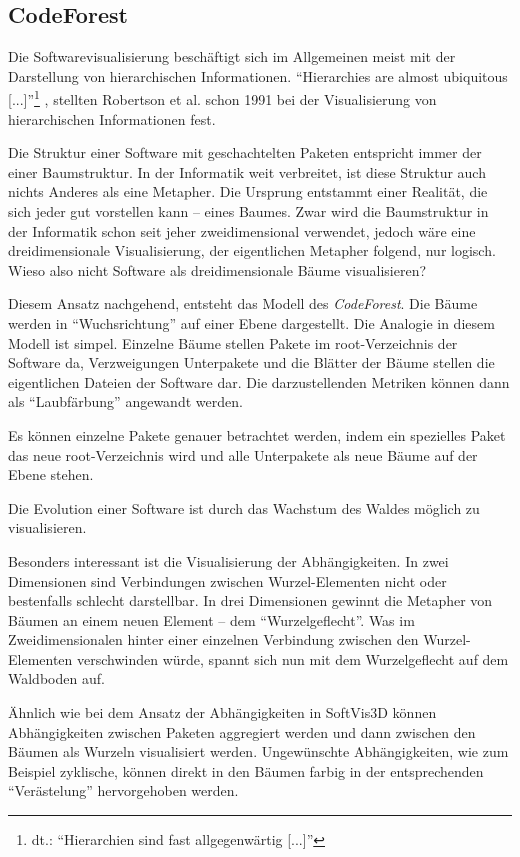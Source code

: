\subsection{CodeForest}

Die Softwarevisualisierung beschäftigt sich im Allgemeinen meist mit der Darstellung von hierarchischen Informationen. ``Hierarchies are almost ubiquitous [...]''\footnote{dt.: "`Hierarchien sind fast allgegenwärtig [...]"'} \cite{robertson1991cone}, stellten Robertson et al. schon 1991 bei der Visualisierung von hierarchischen Informationen fest.

Die Struktur einer Software mit geschachtelten Paketen entspricht immer der einer Baumstruktur. In der Informatik weit verbreitet, ist diese Struktur auch nichts Anderes als eine Metapher. Die Ursprung entstammt einer Realität, die sich jeder gut vorstellen kann -- eines Baumes. Zwar wird die Baumstruktur in der Informatik schon seit jeher zweidimensional verwendet, jedoch wäre eine dreidimensionale Visualisierung, der eigentlichen Metapher folgend, nur logisch. Wieso also nicht Software als dreidimensionale Bäume visualisieren?

Diesem Ansatz nachgehend, entsteht das Modell des \textit{CodeForest}. Die Bäume werden in "`Wuchsrichtung"' auf einer Ebene dargestellt. Die Analogie in diesem Modell ist simpel. Einzelne Bäume stellen Pakete im root-Verzeichnis der Software da, Verzweigungen Unterpakete und die Blätter der Bäume stellen die eigentlichen Dateien der Software dar. Die darzustellenden Metriken können dann als "`Laubfärbung"' angewandt werden. 

Es können einzelne Pakete genauer betrachtet werden, indem ein spezielles Paket das neue root-Verzeichnis wird und alle Unterpakete als neue Bäume auf der Ebene stehen.

Die Evolution einer Software ist durch das Wachstum des Waldes möglich zu visualisieren.

Besonders interessant ist die Visualisierung der Abhängigkeiten. In zwei Dimensionen sind Verbindungen zwischen Wurzel-Elementen nicht oder bestenfalls schlecht darstellbar. In drei Dimensionen gewinnt die Metapher von Bäumen an einem neuen Element -- dem "`Wurzelgeflecht"'. Was im Zweidimensionalen hinter einer einzelnen Verbindung zwischen den Wurzel-Elementen verschwinden würde, spannt sich nun mit dem Wurzelgeflecht auf dem Waldboden auf.

Ähnlich wie bei dem Ansatz der Abhängigkeiten in SoftVis3D können Abhängigkeiten zwischen Paketen aggregiert werden und dann zwischen den Bäumen als Wurzeln visualisiert werden. Ungewünschte Abhängigkeiten, wie zum Beispiel zyklische, können direkt in den Bäumen farbig in der entsprechenden "`Verästelung"' hervorgehoben werden.

